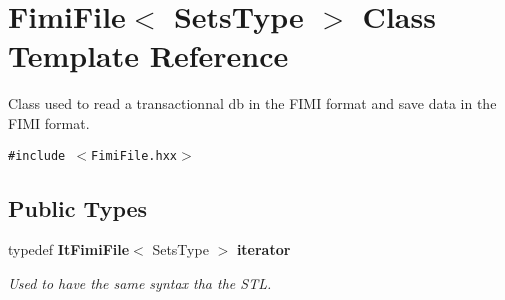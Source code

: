 \section{Fimi\-File$<$ Sets\-Type $>$ Class Template Reference}
\label{class_fimi_file}
Class used to read a transactionnal db in the FIMI format and save data in the FIMI format.  


{\tt \#include $<$Fimi\-File.hxx$>$}

\subsection*{Public Types}
\begin{CompactItemize}
\item 
typedef {\bf It\-Fimi\-File}$<$ Sets\-Type $>$ {\bf iterator}\label{class_fimi_file_31e6c824ac439296b7aa5701d07d81f5}

\begin{CompactList}\small\item\em Used to have the same syntax tha the STL. \item\end{CompactList}\end{CompactItemize}
